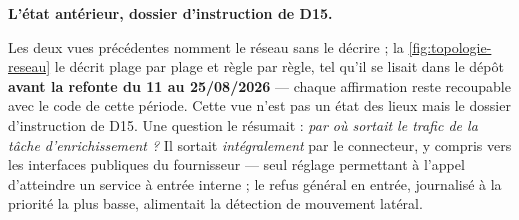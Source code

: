 \noindent\textbf{L'état antérieur, dossier d'instruction de D15.}

Les deux vues précédentes nomment le réseau sans le décrire ; la \cref{fig:topologie-reseau} le
décrit plage par plage et règle par règle, tel qu'il se lisait dans le dépôt \textbf{avant la
refonte du 11 au 25/08/2026} --- chaque affirmation reste recoupable avec le code de cette période.
Cette vue n'est pas un état des lieux mais le dossier d'instruction de D15. Une question le
résumait : \emph{par où sortait le trafic de la tâche d'enrichissement ?} Il sortait
\emph{intégralement} par le connecteur, y compris vers les interfaces publiques du fournisseur ---
seul réglage permettant à l'appel d'atteindre un service à entrée interne ; le refus général en
entrée, journalisé à la priorité la plus basse, alimentait la détection de mouvement latéral.

